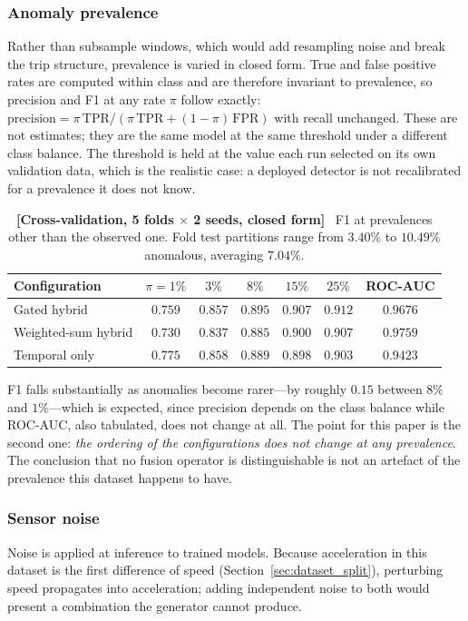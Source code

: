 \documentclass[journal]{IEEEtran}
\begin{document}
\subsubsection{Anomaly prevalence}
Rather than subsample windows, which would add resampling noise and break the
trip structure, prevalence is varied in closed form. True and false positive
rates are computed within class and are therefore invariant to prevalence, so
precision and F1 at any rate $\pi$ follow exactly:
$\mathrm{precision} = \pi\,\mathrm{TPR} / (\pi\,\mathrm{TPR} + (1-\pi)\,\mathrm{FPR})$
with recall unchanged. These are not estimates; they are the same model at the
same threshold under a different class balance. The threshold is held at the
value each run selected on its own validation data, which is the realistic
case: a deployed detector is not recalibrated for a prevalence it does not know.

\begin{table}[!t]
  \centering
  \caption{\textbf{[Cross-validation, 5 folds $\times$ 2 seeds, closed form]}~
  F1 at prevalences other than the observed one. Fold test partitions range
  from $3.40\%$ to $10.49\%$ anomalous, averaging $7.04\%$.}
  \label{tab:prevalence}
  \renewcommand{\arraystretch}{1.2}
  \footnotesize
  \setlength{\tabcolsep}{4pt}
  \begin{tabular}{@{}lcccccc@{}}
    \toprule
    \textbf{Configuration} & $\pi = 1\%$ & $3\%$ & $8\%$ & $15\%$ & $25\%$
    & \textbf{ROC-AUC} \\ \midrule
    Gated hybrid & $0.759$ & $0.857$ & $0.895$ & $0.907$ & $0.912$ & $0.9676$ \\
    Weighted-sum hybrid & $0.730$ & $0.837$ & $0.885$ & $0.900$ & $0.907$ & $0.9759$ \\
    Temporal only & $0.775$ & $0.858$ & $0.889$ & $0.898$ & $0.903$ & $0.9423$ \\
    \bottomrule
  \end{tabular}
\end{table}

F1 falls substantially as anomalies become rarer---by roughly $0.15$ between
$8\%$ and $1\%$---which is expected, since precision depends on the class
balance while ROC-AUC, also tabulated, does not change at all. The point for
this paper is the second one: \emph{the ordering of the configurations does
not change at any prevalence}. The conclusion that no fusion operator is
distinguishable is not an artefact of the prevalence this dataset happens to
have.

\subsubsection{Sensor noise}
Noise is applied at inference to trained models. Because acceleration in this
dataset is the first difference of speed (Section~\ref{sec:dataset_split}),
perturbing speed propagates into acceleration; adding independent noise to
both would present a combination the generator cannot produce.
\end{document}
